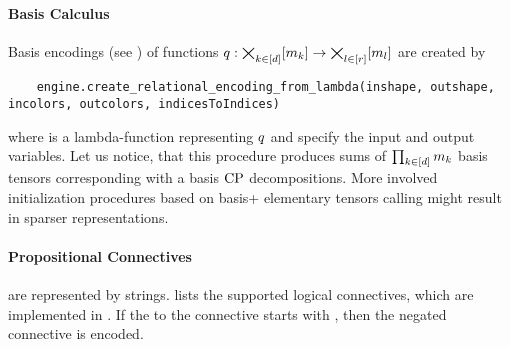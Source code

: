 \paragraph{Basis Calculus}
Basis encodings (see ) of functions $q:\bigtimes_{k\in[d]}[m_{k}] \rightarrow \bigtimes_{l\in[r]}[m_{l}]$ are created by
\begin{lstlisting}
	engine.create_relational_encoding_from_lambda(inshape, outshape, incolors, outcolors, indicesToIndices)
\end{lstlisting}
where  is a lambda-function representing $q$ and  specify the input and output variables.
Let us notice, that this procedure produces sums of $\prod_{k\in[d]}m_{k}$ basis tensors corresponding with a basis $\mathrm{CP}$ decompositions.
More involved initialization procedures based on basis+ elementary tensors calling  might result in sparser representations.

\paragraph{Propositional Connectives} are represented by strings.
 lists the supported logical connectives, which are implemented in .
If the  to the connective starts with , then the negated connective is encoded.

